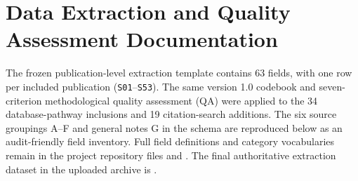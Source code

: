 \section{Data Extraction and Quality Assessment Documentation}
\label{app:extraction}
The frozen publication-level extraction template contains 63 fields, with one row per included publication (\texttt{S01}--\texttt{S53}). The same version 1.0 codebook and seven-criterion methodological quality assessment (QA) were applied to the 34 database-pathway inclusions and 19 citation-search additions. The six source groupings A--F and general notes G in the schema are reproduced below as an audit-friendly field inventory. Full field definitions and category vocabularies remain in the project repository files  and . The final authoritative extraction dataset in the uploaded archive is .
